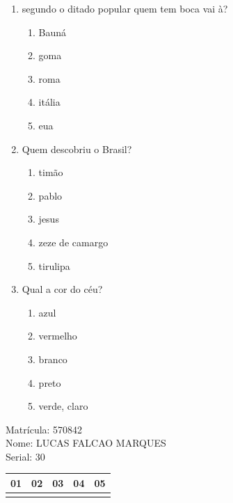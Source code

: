 \documentclass[10pt,a4paper,twocolumn]{report}
\begin{document}
 \begin{enumerate} 
    \item  segundo o ditado popular quem tem boca vai à?





    \begin{enumerate}
    \item  Bauná

\item  goma

\item  roma

\item  itália

\item  eua


    \end{enumerate} 
    \item  Quem descobriu o Brasil?





    \begin{enumerate}
    \item  timão

\item  pablo

\item  jesus

\item  zeze de camargo

\item  tirulipa


    \end{enumerate} 
    \item  Qual a cor do céu?





    \begin{enumerate}
    \item  azul

\item  vermelho

\item  branco

\item  preto

\item  verde, claro


    \end{enumerate}\end{enumerate} 
Matrícula: 570842\\ Nome: LUCAS FALCAO MARQUES \\ Serial: 30\\
\begin{tabular}{|l|l|l|l|l|}\hline
01  &02  &03  &04  &05 \\ \hline 
 & & & & \\ \hline 
\end{tabular}
 \cleardoublepage 
\end{document}
